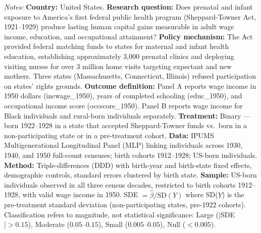 \begin{table}[htbp]
\begin{threeparttable}
\begin{tablenotes}[flushleft]
\item \textit{Notes:} \textbf{Country:} United States. \textbf{Research question:} Does prenatal and infant exposure to America's first federal public health program (Sheppard-Towner Act, 1921--1929) produce lasting human capital gains measurable in adult wage income, education, and occupational attainment? \textbf{Policy mechanism:} The Act provided federal matching funds to states for maternal and infant health education, establishing approximately 3,000 prenatal clinics and deploying visiting nurses for over 3 million home visits targeting expectant and new mothers. Three states (Massachusetts, Connecticut, Illinois) refused participation on states' rights grounds. \textbf{Outcome definition:} Panel A reports wage income in 1950 dollars (incwage\_1950), years of completed schooling (educ\_1950), and occupational income score (occscore\_1950). Panel B reports wage income for Black individuals and rural-born individuals separately. \textbf{Treatment:} Binary --- born 1922--1928 in a state that accepted Sheppard-Towner funds vs.\ born in a non-participating state or in a pre-treatment cohort. \textbf{Data:} IPUMS Multigenerational Longitudinal Panel (MLP) linking individuals across 1930, 1940, and 1950 full-count censuses; birth cohorts 1912--1928; US-born individuals. \textbf{Method:} Triple-differences (DDD) with birth-year and birth-state fixed effects, demographic controls, standard errors clustered by birth state. \textbf{Sample:} US-born individuals observed in all three census decades, restricted to birth cohorts 1912--1928, with valid wage income in 1950. SDE $= \hat{\beta} / \text{SD}(Y)$ where SD($Y$) is the pre-treatment standard deviation (non-participating states, pre-1922 cohorts). Classification refers to magnitude, not statistical significance: Large ($|$SDE$| > 0.15$), Moderate ($0.05$--$0.15$), Small ($0.005$--$0.05$), Null ($< 0.005$). 
\end{tablenotes}
\end{threeparttable}
\end{table}
